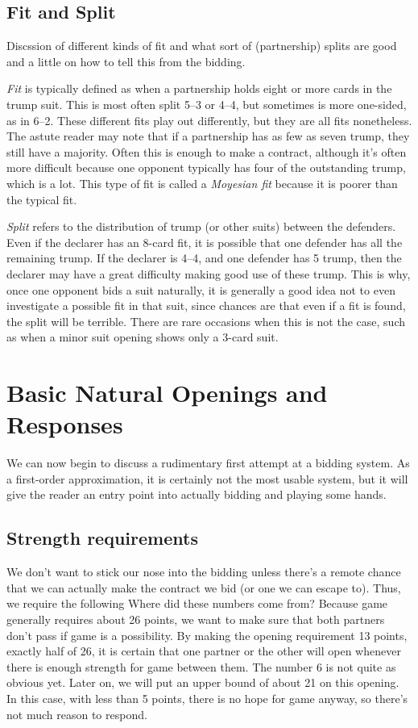 \documentclass[oneside]{memoir}
\begin{document}
\section{Fit and Split}
Discssion of different kinds of fit and what sort of (partnership)
splits are good and a little on how to tell this from the bidding.

\textit{Fit} is typically defined as when a partnership holds eight
or more cards in the trump suit.  This is most often split 5--3 or
4--4, but sometimes is more one-sided, as in 6--2.  These different
fits play out differently, but they are all fits nonetheless.  The
astute reader may note that if a partnership has as few as seven trump,
they still have a majority.  Often this is enough to make a contract,
although it's often more difficult because one opponent typically has
four of the outstanding trump, which is a lot.  This type of fit is
called a \textit{Moyesian fit} because it is poorer than the typical fit.

\textit{Split} refers to the distribution of trump (or other suits)
between the defenders.  Even if the declarer has an 8-card fit, it
is possible that one defender has all the remaining trump.  If the
declarer is 4--4, and one defender has 5 trump, then the declarer may
have a great difficulty making good use of these trump.  This is why,
once one opponent bids a suit naturally, it is generally a good idea
not to even investigate a possible fit in that suit, since chances are
that even if a fit is found, the split will be terrible.  There are
rare occasions when this is not the case, such as when a minor suit
opening shows only a 3-card suit.

\chapter{Basic Natural Openings and Responses}
We can now begin to discuss a rudimentary first attempt at a bidding
system.  As a first-order approximation, it is certainly not the most
usable system, but it will give the reader an entry point into actually
bidding and playing some hands.

\section{Strength requirements}
We don't want to stick our nose into the bidding unless there's a remote
chance that we can actually make the contract we bid (or one we can escape to).
Thus, we require the following
Where did these numbers come from?  Because game generally requires about
26 points, we want to make sure that both partners don't pass if game is
a possibility.  By making the opening requirement 13 points, exactly half
of 26, it is certain that one partner or the other will open whenever there
is enough strength for game between them.  The number 6 is not quite as
obvious yet.  Later on, we will put an upper bound of about 21 on
this opening.  In this case, with less than 5 points, there is no hope for
game anyway, so there's not much reason to respond.
\end{document}
